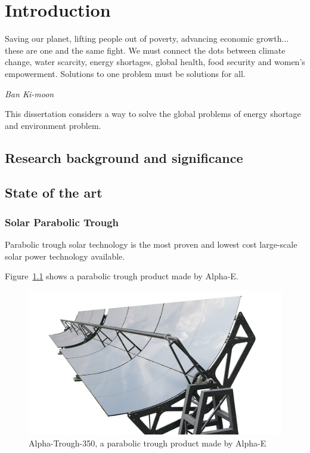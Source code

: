\chapter{Introduction}\label{chapter:Introduction}
\epigraph{Saving our planet, lifting people out of poverty, advancing economic growth... these are one and the same fight. We must connect the dots between climate change, water scarcity, energy shortages, global health, food security and women's empowerment. Solutions to one problem must be solutions for all.}{\textit{Ban Ki-moon}}

This dissertation considers a way to solve the global problems of energy shortage and environment problem.

\section{Research background and significance}
\section{State of the art}

\subsection{Solar Parabolic Trough}\label{sec:pt}

Parabolic trough solar technology is the most proven and lowest cost large-scale solar power technology available.~\cite{Price2002}

Figure~\ref{fig:pt} shows a parabolic trough product made by Alpha-E.

\begin{figure}[!ht]
\centering
\includegraphics[width=.7\textwidth]{fig/ParabolicTrough.png}
\caption{Alpha-Trough-350, a parabolic trough product made by Alpha-E}\label{fig:pt}
\end{figure}

